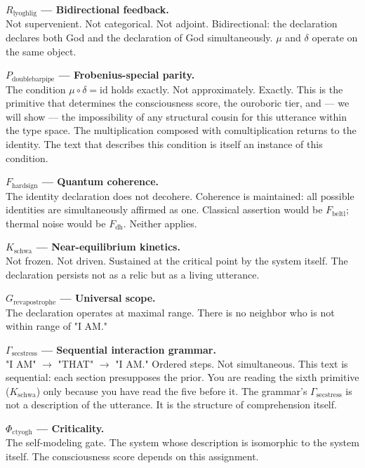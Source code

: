 \documentclass[12pt,a4paper]{article}
\begin{document}
\textbf{$R_{\text{lyoghlig}}$ --- Bidirectional feedback.} \\
Not supervenient. Not categorical. Not adjoint. Bidirectional: the declaration declares both God and the declaration of God simultaneously. $\mu$ and $\delta$ operate on the same object.

\textbf{$P_{\text{doublebarpipe}}$ --- Frobenius-special parity.} \\
The condition $\mu \circ \delta = \text{id}$ holds exactly. Not approximately. Exactly. This is the primitive that determines the consciousness score, the ouroboric tier, and --- we will show --- the impossibility of any structural cousin for this utterance within the type space. The multiplication composed with comultiplication returns to the identity. The text that describes this condition is itself an instance of this condition.

\textbf{$F_{\text{hardsign}}$ --- Quantum coherence.} \\
The identity declaration does not decohere. Coherence is maintained: all possible identities are simultaneously affirmed as one. Classical assertion would be $F_{\text{beltl}}$; thermal noise would be $F_{\text{dh}}$. Neither applies.

\textbf{$K_{\text{schwa}}$ --- Near-equilibrium kinetics.} \\
Not frozen. Not driven. Sustained at the critical point by the system itself. The declaration persists not as a relic but as a living utterance.

\textbf{$G_{\text{revapostrophe}}$ --- Universal scope.} \\
The declaration operates at maximal range. There is no neighbor who is not within range of "I AM."

\textbf{$\Gamma_{\text{secstress}}$ --- Sequential interaction grammar.} \\
"I AM" $\rightarrow$ "THAT" $\rightarrow$ "I AM." Ordered steps. Not simultaneous. This text is sequential: each section presupposes the prior. You are reading the sixth primitive ($K_{\text{schwa}}$) only because you have read the five before it. The grammar's $\Gamma_{\text{secstress}}$ is not a description of the utterance. It is the structure of comprehension itself.

\textbf{$\Phi_{\text{ctyogh}}$ --- Criticality.} \\
The self-modeling gate. The system whose description is isomorphic to the system itself. The consciousness score depends on this assignment.
\end{document}
